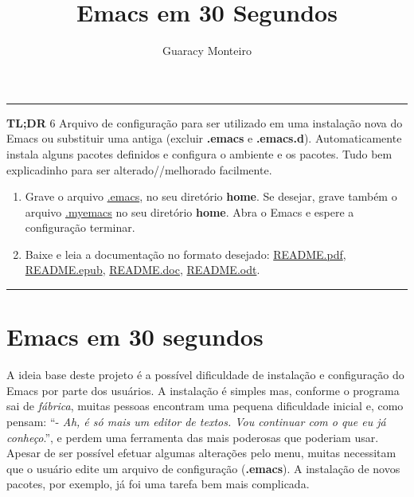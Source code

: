 \documentclass[]{article}
\title{Emacs em 30 Segundos}
\author{Guaracy Monteiro}
\date{}
\providecommand{\tightlist}{%
  \setlength{\itemsep}{0pt}\setlength{\parskip}{0pt}}
\begin{document}
\maketitle

{
\setcounter{tocdepth}{3}
\tableofcontents
}
\pagebreak

\begin{center}\rule{0.5\linewidth}{\linethickness}\end{center}

\textbf{TL;DR} 6 Arquivo de configuração para ser utilizado em uma
instalação nova do Emacs ou substituir uma antiga (excluir
\textbf{.emacs} e \textbf{.emacs.d}). Automaticamente instala alguns
pacotes definidos e configura o ambiente e os pacotes. Tudo bem
explicadinho para ser alterado//melhorado facilmente.

\begin{enumerate}
\tightlist
\item
  Grave o arquivo
  \href{https://raw.githubusercontent.com/guaracy/emacs/master/config/.emacs}{.emacs},
  no seu diretório \textbf{home}. Se desejar, grave também o arquivo
  \href{https://raw.githubusercontent.com/guaracy/emacs/master/config/.myemacs}{.myemacs}
  no seu diretório \textbf{home}. Abra o Emacs e espere a configuração
  terminar.
\item
  Baixe e leia a documentação no formato desejado:
  \href{https://raw.githubusercontent.com/guaracy/emacs/master/config/docs/README.pdf}{README.pdf},
  \href{https://raw.githubusercontent.com/guaracy/emacs/master/config/docs/README.epub}{README.epub},
  \href{https://raw.githubusercontent.com/guaracy/emacs/master/config/docs/README.docx}{README.doc},
  \href{https://raw.githubusercontent.com/guaracy/emacs/master/config/docs/README.odt}{README.odt}.
\end{enumerate}

\begin{center}\rule{0.5\linewidth}{\linethickness}\end{center}

\pagebreak

\section{Emacs em 30 segundos}\label{emacs-em-30-segundos}

A ideia base deste projeto é a possível dificuldade de instalação e
configuração do Emacs por parte dos usuários. A instalação é simples
mas, conforme o programa sai de \emph{fábrica}, muitas pessoas encontram
uma pequena dificuldade inicial e, como pensam: ``- \emph{Ah, é só mais
um editor de textos. Vou continuar com o que eu já conheço}.'', e perdem
uma ferramenta das mais poderosas que poderiam usar. Apesar de ser
possível efetuar algumas alterações pelo menu, muitas necessitam que o
usuário edite um arquivo de configuração (\textbf{.emacs}). A instalação
de novos pacotes, por exemplo, já foi uma tarefa bem mais complicada.
\end{document}
